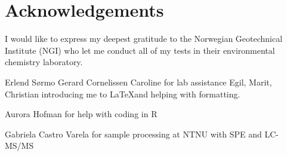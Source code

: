 \newpage
{}
\section*{Acknowledgements}
I would like to express my deepest gratitude to the Norwegian Geotechnical Institute (NGI) who let me conduct all of my tests in their environmental chemistry laboratory.

Erlend Sørmo
Gerard Cornelissen
Caroline for lab assistance
Egil, Marit, Christian introducing me to  \LaTeX and helping with formatting.

Aurora Hofman for help with coding in R

Gabriela Castro Varela for sample processing at NTNU with SPE and LC-MS/MS



